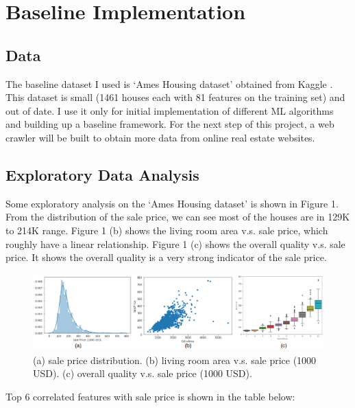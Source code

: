 \documentclass{article} %
\begin{document}
\section{Baseline Implementation}

\subsection{Data}

The baseline dataset I used is `Ames Housing dataset' obtained from Kaggle \cite{kaggle}.
This dataset is small (1461 houses each with 81 features on the training set)
and out of date. 
I use it only for initial implementation of different ML algorithms
and building up a baseline framework.
For the next step of this project,
a web crawler will be built to obtain more data
from online real estate websites.
 
\subsection{Exploratory Data Analysis}

Some exploratory analysis on the `Ames Housing dataset' is shown in Figure 1.
From the distribution of the sale price,
we can see most of the houses are in 129K to 214K range.
Figure 1 (b) shows the living room area v.s. sale price,
which roughly have a linear relationship.
Figure 1 (c) shows the overall quality v.s. sale price.
It shows the overall quality is a very strong indicator of the sale price.

\begin{figure}[h]
	\begin{center}
		\includegraphics[width=1\linewidth]{fig/eda.png}
	\end{center}
	\caption{(a) sale price distribution. (b) living room area v.s. sale price (1000 USD). (c) overall quality v.s. sale price (1000 USD).}
	\label{fig:long}
	\label{fig:onecol}
\end{figure}

Top 6 correlated features with sale price is shown in the table below:
\end{document}
